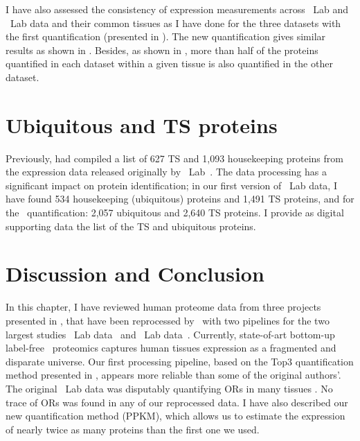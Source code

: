 I have also assessed the consistency of expression measurements
across \pandey\ Lab and \kuster\ Lab data and their common tissues
as I have done for the three datasets with the first quantification
(presented in ).
The new quantification gives similar results
as shown in .
Besides, as shown in ,
more than half of the proteins quantified in each dataset
within a given tissue is also quantified in the other dataset.\mybr\


\begin{comment}
\citet{Nesvizhskii2003-ls} propose a method that may seem alike,
but their method apportions the degenerate peptides
among all corresponding proteins to estimate their presence likelihood in an experiment.
They focus on the identification while the quantification remains overlooked.\mybr\
\end{comment}

\section{Ubiquitous and TS proteins}
Previously, \citet{Liu2014-xr} had compiled a list of 627 \gls{TS} and
1,093 housekeeping proteins
from the expression data released originally by \pandey\ Lab~.
The data processing has a significant impact on protein identification;
in our first version of \pandey\ Lab data,
I have found 534 housekeeping (ubiquitous) proteins and 1,491 \gls{TS} proteins,
and for the \PPKM\ quantification: 2,057 ubiquitous and 2,640 \gls{TS} proteins.
I provide as digital supporting data the list of the \gls{TS} and
ubiquitous proteins.\mybr\


\section{Discussion and Conclusion}

In this chapter, I have reviewed human proteome data
from three projects presented in ,
that have been reprocessed by \james\ with two pipelines
for the two largest studies \pandey\ Lab data~
and \kuster\ Lab data~\mycite{KusterData}.
Currently, state-of-art bottom-up label-free \ms\ proteomics captures
human tissues expression as a fragmented and disparate universe.
Our first processing pipeline,
based on the Top3 quantification method presented in ,
appears more reliable than some of the original authors'.
The original \pandey\ Lab data was disputably quantifying \glspl{OR} in many tissues
\mycite{Ezkurdia2014-qx}.
No trace of \glspl{OR} was found in any of our reprocessed data.
I have also described our new quantification method (\gls{PPKM}),
which allows us to estimate the expression of nearly twice as many proteins
than the first one we used.\mybr\

